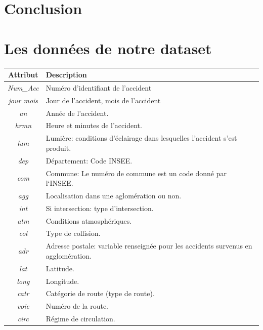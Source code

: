 \documentclass{article}
\begin{document}
    \section{Conclusion}


    \newpage
    \appendix

    \section{Les données de notre dataset}
    \label{appendix:dataset}
    \begin{center}
        \begin{tabular}{ |c|p{9cm}| }
            \hline
            \textbf{Attribut} & \textbf{Description} \\
            \hline
            \textit{Num\_Acc} & Numéro d'identifiant de l'accident \\
            \textit{jour mois} & Jour de l'accident, mois de l'accident \\
            \textit{an} & Année de l'accident. \\
            \textit{hrmn} & Heure et minutes de l'accident. \\
            \textit{lum} & Lumière: conditions d'éclairage dans lesquelles l'accident s'est produit. \\
            \textit{dep} & Département: Code INSEE.\\
            \textit{com} & Commune: Le numéro de commune est un code donné par l‘INSEE. \\
            \textit{agg} & Localisation dans une aglomération ou non. \\
            \textit{int} & Si intersection: type d'intersection. \\
            \textit{atm} & Conditions atmosphériques. \\
            \textit{col} & Type de collision. \\
            \textit{adr} & Adresse postale: variable renseignée pour les accidents survenus en agglomération. \\
            \textit{lat} & Latitude. \\
            \textit{long} & Longitude. \\
            \textit{catr} & Catégorie de route (type de route). \\  
            \textit{voie} & Numéro de la route. \\  
            \textit{circ} & Régime de circulation. \\  

\end{tabular}
\end{center}
\end{document}
